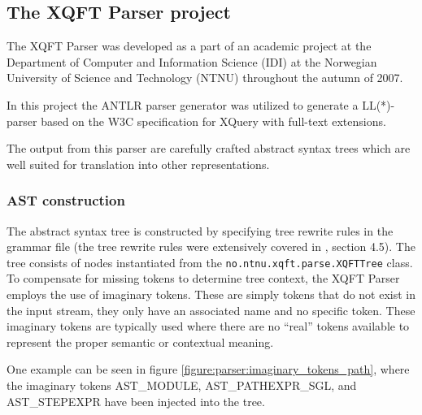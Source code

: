 \subsection{The XQFT Parser project}
\label{sect:theory:xqftparser}
The XQFT Parser\cite{ourselves} was developed as a part of an academic project
at the Department of Computer and Information Science (IDI) at the Norwegian
University of Science and Technology (NTNU) throughout the autumn of 2007.

In this project the ANTLR parser generator was utilized to generate a
LL(*)-parser based on the W3C specification\cite{w3c01} for XQuery with
full-text extensions.

The output from this parser are carefully crafted abstract syntax trees which
are well suited for translation into other representations.

\subsubsection{AST construction}
The abstract syntax tree is constructed by specifying tree rewrite rules in the
grammar file (the tree rewrite rules were extensively covered in \cite{ourselves}, section
4.5). The tree consists of nodes instantiated from the
\verb!no.ntnu.xqft.parse.XQFTTree! class. To compensate for missing tokens to
determine tree context, the XQFT Parser employs the use of imaginary tokens.
These are simply tokens that do not exist in the input stream, they only have
an associated name and no specific token. These imaginary tokens are typically
used where there are no ``real'' tokens available to represent the proper
semantic or contextual meaning.

One example can be seen in figure \ref{figure:parser:imaginary_tokens_path},
where the imaginary tokens AST\_MODULE, AST\_PATHEXPR\_SGL, and AST\_STEPEXPR
have been injected into the tree.

